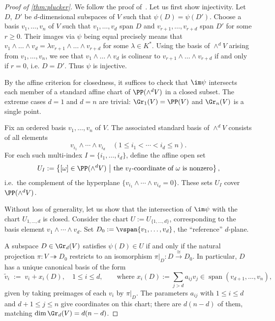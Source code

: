 \begin{proof}[Proof of \cref{thm:plucker}]
    We follow the proof of~\cite[Section~1.8]{humphreys_linear_1975}. Let us first show injectivity. Let $D$, $D'$ be $d$-dimensional subspaces of $V$ such that $\psi(D) = \psi(D')$. Choose a basis $v_1, \ldots, v_n$ of $V$ such that $v_1, \ldots, v_d$ span $D$ and $v_{r + 1}, \ldots, v_{r+d}$ span $D'$ for some $r \geq 0$. Their images via $\psi$ being equal precisely means that $v_1 \wedge \ldots \wedge v_d = \lambda v_{r+1} \wedge \ldots \wedge v_{r+d}$ for some $\lambda \in K^*$. Using the basis of $\wedge^d V$ arising from $v_1, \ldots, v_n$, we see that $v_1 \wedge \ldots \wedge v_d$ is colinear to $v_{r+1} \wedge \ldots \wedge v_{r+d}$ if and only if $r = 0$, i.e. $D=D'$. Thus $\psi$ is injective.

    By the affine criterion for closedness, it suffices to check that $\im\psi$ intersects each member of a standard affine chart of $\PP(\wedge^d V)$ in a closed subset. The extreme cases $d=1$ and $d=n$ are trivial: $\Gr_1(V) = \PP(V)$ and $\Gr_n(V)$ is a single point.

    Fix an ordered basis $v_1, \ldots, v_n$ of $V$.  The associated standard basis of $\wedge^d V$ consists of all elements
    \[
        v_{i_1} \wedge \cdots \wedge v_{i_d} \quad \left(1 \le i_1 < \cdots < i_d \le n\right).
    \]
    For each such multi-index $I = \{i_1,\ldots,i_d\}$, define the affine open set
    \[
        U_I := \left\{[\omega] \in \PP(\wedge^d V) ~\middle|~
            \text{the } v_I\text{-coordinate of }\omega \text{ is nonzero}\right\},
    \]
    i.e.\ the complement of the hyperplane $\{v_{i_1}\wedge\cdots\wedge v_{i_d} = 0\}$.
    These sets $U_I$ cover $\PP(\wedge^d V)$.
    
    Without loss of generality, let us show that the intersection of $\im \psi$ with the chart $U_{1, \ldots, d}$ is closed.
    Consider the chart $U := U_{\{1,\ldots,d\}}$, corresponding to the basis
    element $v_1 \wedge \cdots \wedge v_d$.  Set $D_0 := \vspan{v_1,
    \ldots, v_d}$, the ``reference'' $d$-plane.

    A subspace $D \in \Gr_d(V)$ satisfies $\psi(D) \in U$ if and only if the
    natural projection $\pi : V \twoheadrightarrow D_0$ restricts to an isomorphism
    $\pi|_D : D \xrightarrow{\cong} D_0$.  In particular, $D$ has a unique
    canonical basis of the form
    \begin{equation*}
        \tilde{v}_i \;:=\; v_i + x_i(D), \quad 1 \le i \le d,
        \qquad \text{where } x_i(D) := \sum_{j > d} a_{ij} v_j \in
        \operatorname{span}(v_{d+1},\ldots,v_n),
    \end{equation*}
    given by taking preimages of each $v_i$ by $\pi|_D$.  The
    parameters $a_{ij}$ with $1 \le i \le d$ and $d+1 \le j \le n$ give coordinates
    on this chart; there are $d(n-d)$ of them, matching ${\dim\Gr_d(V) = d(n-d)}$.


\end{proof}
